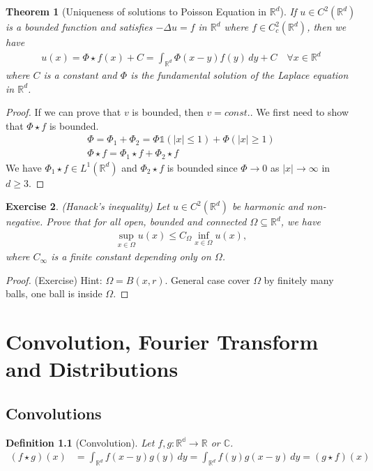 \documentclass{report}
\theoremstyle{tommy}
\newtheorem{defn}{Definition}
\newtheorem{thm}[defn]{Theorem}
\newtheorem{ex}[defn]{Exercise}
\begin{document}
  \begin{thm}[Uniqueness of solutions to Poisson Equation in \(\mathbb{R}^d\)]
    If \(u \in C^2(\mathbb{R}^d)\) is a bounded function and satisfies \(- \Delta u = f\) in \(\mathbb{R}^d\) where \(f \in C_c^2(\mathbb{R}^d)\), then we have
    \begin{align*}
      u(x) = \Phi \star f(x) + C = \int_{\mathbb{R}^d} \Phi(x-y)f(y) \, dy + C \quad \forall x \in \mathbb{R}^d
    \end{align*}
    where \(C\) is a constant and \(\Phi\) is the fundamental solution of the Laplace equation in \(\mathbb{R}^d\).
  \end{thm}

  \begin{proof}
    If we can prove that \(v\) is bounded, then \(v = const.\). We first need to show that \(\Phi \star f\) is bounded.
    \begin{align*}
      \Phi = \Phi_1 + \Phi_2 = \Phi \mathbb{1}(|x| \le 1) + \Phi(|x| \ge 1) \\
      \Phi \star f = \Phi_1 \star f + \Phi_2 \star f
    \end{align*}
    We have \(\Phi_1 \star f \in L^1(\mathbb{R}^d)\) and \(\Phi_2 \star f\) is bounded since \(\Phi \to 0\)  as \(|x| \to \infty\)  in \(d \ge 3\).
  \end{proof}

  \begin{ex} (Hanack's inequality)
    Let \(u \in C^2(\mathbb{R}^d)\) be harmonic and non-negative. Prove that for all open, bounded and connected \(\Omega \subseteq \mathbb{R}^d\), we have
    \begin{align*}
      \sup_{x \in \Omega} u(x) \le C_\Omega \inf_{x \in \Omega} u(x),
    \end{align*}
    where \(C_\infty\) is a finite constant depending only on \(\Omega\).
  \end{ex}

  \begin{proof} (Exercise)
    Hint: \(\Omega = B(x,r)\). General case cover \(\Omega\) by finitely many balls, one ball is inside \(\Omega\).
  \end{proof}


  \chapter{Convolution, Fourier Transform and Distributions}

  \section{Convolutions}
  \begin{defn}[Convolution]
    Let \(f, g: \mathbb{{R}^d \to \mathbb{R}}\) or \(\mathbb{C}\).
    \begin{align*}
      (f \star g)(x)
      &= \int_{\mathbb{R}^d} f(x-y) g(y) \, dy
      = \int_{\mathbb{R}^d} f(y) g(x-y) \, dy 
      = (g \star f)(x)
    \end{align*}
  \end{defn}
\end{document}
